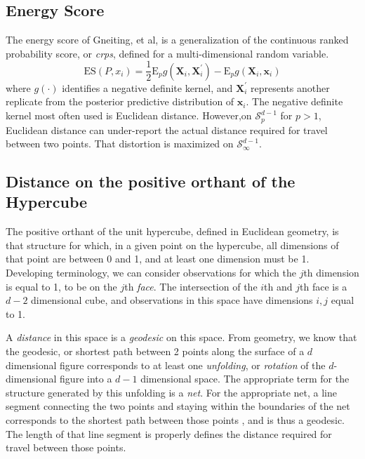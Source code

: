 \subsection{Energy Score}
The energy score of Gneiting, et al\cite{gneiting2007}, is a generalization of the continuous ranked
  probability score, or \emph{crps}, defined for a multi-dimensional random variable.
  \begin{equation}
    \label{eq:es}
    \text{ES}(P,x_i) = \frac{1}{2}\text{E}_p g(\bm{X}_i,\bm{X}_i^{\prime}) - \text{E}_p g(\bm{X}_i, \bm{x}_i)
  \end{equation}
  where $g(\cdot)$ identifies a negative definite kernel, and $\bm{X}_i^{\prime}$ represents another
  replicate from the posterior predictive distribution of $\bm{x}_i$. The negative definite kernel
  most often used is Euclidean distance.  However,on $\mathcal{S}_p^{d-1}$ for $p > 1$, Euclidean
  distance can under-report the actual distance required for travel between two points. That distortion
  is maximized on $\mathcal{S}_{\infty}^{d-1}$.

\subsection{Distance on the positive orthant of the Hypercube}
  \label{subsec:distance}
The positive orthant of the unit hypercube, defined in Euclidean geometry, is that structure for
  which, in a given point on the hypercube, all dimensions of that point are between 0 and 1, and
  at least one dimension must be 1.  Developing terminology, we can consider observations for which
  the $j$th dimension is equal to 1, to be on the $j$th \emph{face}.  The intersection of the $i$th
  and $j$th face is a $d-2$ dimensional cube, and observations in this space have dimensions $i,j$
  equal to 1.

A \emph{distance} in this space is a \emph{geodesic} on this space. From geometry, we know that
  the geodesic, or shortest path between 2 points along the surface of a $d$ dimensional figure
  corresponds to at least one \emph{unfolding}, or \emph{rotation} of the $d$-dimensional
  figure into a $d-1$ dimensional space.  The appropriate term for the structure generated by this
  unfolding is a \emph{net}.  For the appropriate net, a line segment connecting the two points and
  staying within the boundaries of the net corresponds to the shortest path between those points
  , and is thus a geodesic.  The length of that line segment is properly
  defines the distance required for travel between those points.

